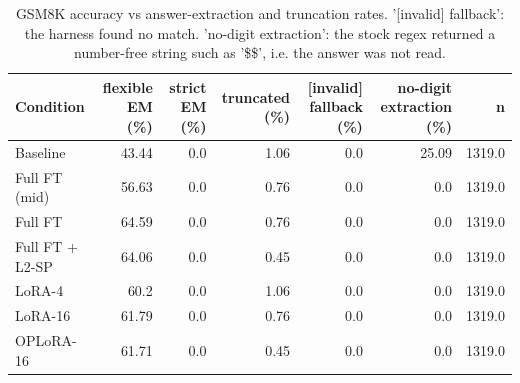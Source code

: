 \begin{table}[t]
\centering\small
\begin{tabular}{lrrrrrr}
\toprule
Condition & flexible EM (\%) & strict EM (\%) & truncated (\%) & [invalid] fallback (\%) & no-digit extraction (\%) & n \\
\midrule
Baseline & 43.44 & 0.0 & 1.06 & 0.0 & 25.09 & 1319.0 \\
Full FT (mid) & 56.63 & 0.0 & 0.76 & 0.0 & 0.0 & 1319.0 \\
Full FT & 64.59 & 0.0 & 0.76 & 0.0 & 0.0 & 1319.0 \\
Full FT + L2-SP & 64.06 & 0.0 & 0.45 & 0.0 & 0.0 & 1319.0 \\
LoRA-4 & 60.2 & 0.0 & 1.06 & 0.0 & 0.0 & 1319.0 \\
LoRA-16 & 61.79 & 0.0 & 0.76 & 0.0 & 0.0 & 1319.0 \\
OPLoRA-16 & 61.71 & 0.0 & 0.45 & 0.0 & 0.0 & 1319.0 \\
\bottomrule
\end{tabular}
\caption{GSM8K accuracy vs answer-extraction and truncation rates. '[invalid] fallback': the harness found no match. 'no-digit extraction': the stock regex returned a number-free string such as '\$\$', i.e. the answer was not read.}
\label{tab:task1_gsm8k_format}
\end{table}
